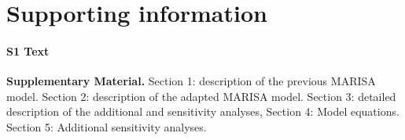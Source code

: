 \documentclass[10pt,letterpaper]{article}
\begin{document}
\section*{Supporting information}

\paragraph*{S1 Text}
\label{s1_file}
{\bf Supplementary Material.} Section 1: description of the previous  MARISA model. Section 2: description of the adapted MARISA model. Section 3: detailed description of the additional and sensitivity analyses, Section 4: Model equations. Section 5: Additional sensitivity analyses.

\nolinenumbers

\newpage
%

\end{document}
